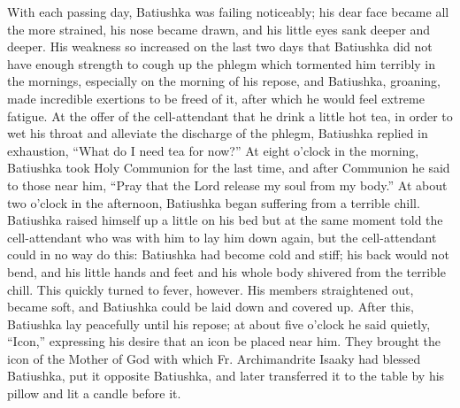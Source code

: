 With each passing day, Batiushka was failing noticeably; his dear face became all the more strained, his nose became drawn, and his little eyes sank deeper and deeper. His weakness so increased on the last two days that Batiushka did not have enough strength to cough up the phlegm which tormented him terribly in the mornings, especially on the morning of his repose, and Batiushka, groaning, made incredible exertions to be freed of it, after which he would feel extreme fatigue. At the offer of the cell-attendant that he drink a little hot tea, in order to wet his throat and alleviate the discharge of the phlegm, Batiushka replied in exhaustion, ``What do I need tea for now?'' At eight o'clock in the morning, Batiushka took Holy Communion for the last time, and after Communion he said to those near him, ``Pray that the Lord release my soul from my body.'' At about two o'clock in the afternoon, Batiushka began suffering from a terrible chill. Batiushka raised himself up a little on his bed but at the same moment told the cell-attendant who was with him to lay him down again, but the cell-attendant could in no way do this: Batiushka had become cold and stiff; his back would not bend, and his little hands and feet and his whole body shivered from the terrible chill. This quickly turned to fever, however. His members straightened out, became soft, and Batiushka could be laid down and covered up. After this, Batiushka lay peacefully until his repose; at about five o'clock he said quietly, ``Icon,'' expressing his desire that an icon be placed near him. They brought the icon of the Mother of God with which Fr. Archimandrite Isaaky had blessed Batiushka, put it opposite Batiushka, and later transferred it to the table by his pillow and lit a candle before it.

